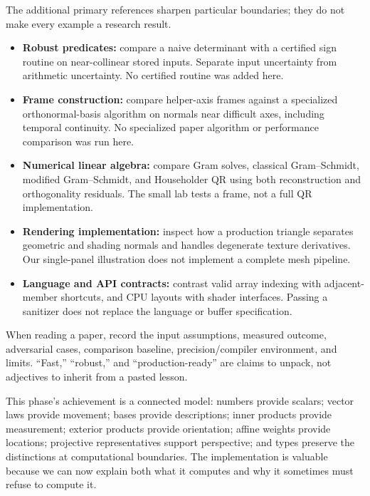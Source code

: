 \hypertarget{02-foundations-ii-ch039-research-connections-without-borrowed-certainty}{}

The additional primary references sharpen particular boundaries; they do not make every example a research result.

\begin{itemize}
\tightlist
\item
  \textbf{Robust predicates:} compare a naive determinant with a certified sign routine on near-collinear stored inputs. Separate input uncertainty from arithmetic uncertainty. No certified routine was added here.
\item
  \textbf{Frame construction:} compare helper-axis frames against a specialized orthonormal-basis algorithm on normals near difficult axes, including temporal continuity. No specialized paper algorithm or performance comparison was run here.
\item
  \textbf{Numerical linear algebra:} compare Gram solves, classical Gram--Schmidt, modified Gram--Schmidt, and Householder QR using both reconstruction and orthogonality residuals. The small lab tests a frame, not a full QR implementation.
\item
  \textbf{Rendering implementation:} inspect how a production triangle separates geometric and shading normals and handles degenerate texture derivatives. Our single-panel illustration does not implement a complete mesh pipeline.
\item
  \textbf{Language and API contracts:} contrast valid array indexing with adjacent-member shortcuts, and CPU layouts with shader interfaces. Passing a sanitizer does not replace the language or buffer specification.
\end{itemize}

When reading a paper, record the input assumptions, measured outcome, adversarial cases, comparison baseline, precision/compiler environment, and limits. ``Fast,'' ``robust,'' and ``production-ready'' are claims to unpack, not adjectives to inherit from a pasted lesson.

This phase's achievement is a connected model: numbers provide scalars; vector laws provide movement; bases provide descriptions; inner products provide measurement; exterior products provide orientation; affine weights provide locations; projective representatives support perspective; and types preserve the distinctions at computational boundaries. The implementation is valuable because we can now explain both what it computes and why it sometimes must refuse to compute it.

